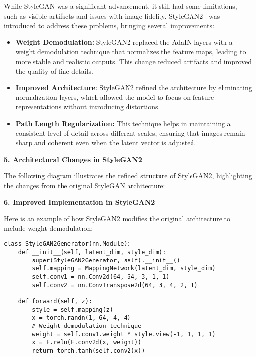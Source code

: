 While StyleGAN was a significant advancement, it still had some limitations, such as visible artifacts and issues with image fidelity. StyleGAN2~\cite{karras2019style} was introduced to address these problems, bringing several improvements:
\begin{itemize}
    \item \textbf{Weight Demodulation:} StyleGAN2 replaced the AdaIN layers with a weight demodulation technique that normalizes the feature maps, leading to more stable and realistic outputs. This change reduced artifacts and improved the quality of fine details.
    \item \textbf{Improved Architecture:} StyleGAN2 refined the architecture by eliminating normalization layers, which allowed the model to focus on feature representations without introducing distortions.
    \item \textbf{Path Length Regularization:} This technique helps in maintaining a consistent level of detail across different scales, ensuring that images remain sharp and coherent even when the latent vector is adjusted.
\end{itemize}

\textbf{5. Architectural Changes in StyleGAN2}

The following diagram illustrates the refined structure of StyleGAN2, highlighting the changes from the original StyleGAN architecture:

\begin{center}
\footnotesize
{}
\end{center}

\textbf{6. Improved Implementation in StyleGAN2}

Here is an example of how StyleGAN2 modifies the original architecture to include weight demodulation:

\begin{lstlisting}[style=python]
class StyleGAN2Generator(nn.Module):
    def __init__(self, latent_dim, style_dim):
        super(StyleGAN2Generator, self).__init__()
        self.mapping = MappingNetwork(latent_dim, style_dim)
        self.conv1 = nn.Conv2d(64, 64, 3, 1, 1)
        self.conv2 = nn.ConvTranspose2d(64, 3, 4, 2, 1)
    
    def forward(self, z):
        style = self.mapping(z)
        x = torch.randn(1, 64, 4, 4)
        # Weight demodulation technique
        weight = self.conv1.weight * style.view(-1, 1, 1, 1)
        x = F.relu(F.conv2d(x, weight))
        return torch.tanh(self.conv2(x))
\end{lstlisting}

